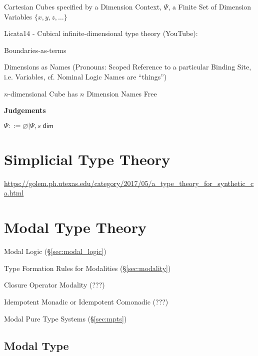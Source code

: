 Cartesian Cubes specified by a Dimension Context, $\Psi$, a Finite Set
of Dimension Variables $\{x,y,z,\ldots\}$


Licata14 - Cubical infinite-dimensional type theory (YouTube):

Boundaries-as-terms

Dimensions as Names (Pronouns: Scoped Reference to a particular
Binding Site, i.e. Variables, cf. Nominal Logic Names are ``things'')

$n$-dimensional Cube has $n$ Dimension Names Free


\textbf{Judgements}

$\Psi ::= \varnothing | \Psi, s \;\mathsf{dim}$



\section{Simplicial Type Theory}\label{sec:simplicial_type_theory}

\url{https://golem.ph.utexas.edu/category/2017/05/a_type_theory_for_synthetic_ca.html}



\section{Modal Type Theory}\label{sec:modal_type_theory}

Modal Logic (\S\ref{sec:modal_logic})

Type Formation Rules for Modalities (\S\ref{sec:modality})

Closure Operator Modality (???)

Idempotent Monadic or Idempotent Comonadic (???)

Modal Pure Type Systems (\S\ref{sec:mpts})



\subsection{Modal Type}\label{sec:modal_type}

